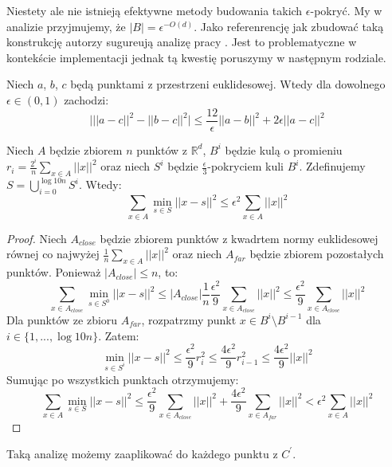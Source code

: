 \noindent
Niestety ale nie istnieją efektywne metody budowania takich $\epsilon$-pokryć.
My w analizie przyjmujemy, że  $|B| = \epsilon^{-O(d)}$.
Jako referenrencję jak zbudować taką konstrukcję autorzy sugureują analizę pracy \cite{chazelle_2000}.
Jest to problematyczne w kontekście implementacji jednak tą kwestię poruszymy w następnym rodziale.
\begin{lemma}{\cite{DBLP:journals/ki/MunteanuS18}}
    Niech $a$, $b$, $c$ będą punktami z przestrzeni euklidesowej.
    Wtedy dla dowolnego $\epsilon \in (0,1)$ zachodzi:
    \begin{equation}
        \Big| ||a-c||^{2} - ||b-c||^{2} \Big| \leq \frac{12}{\epsilon} ||a-b||^2 + 2\epsilon||a-c||^2
    \end{equation}
\end{lemma}
\begin{lemma}
    Niech $A$ będzie zbiorem $n$ punktów z $\mathbb{R}^d$, $B^{i}$ będzie kulą o promieniu $r_{i} = \frac{2^{i}}{n}\sum_{x \in A} ||x||^{2}$ oraz niech $S^{i}$ będzie $\frac{\epsilon}{3}$-pokryciem kuli $B^{i}$.
    Zdefinujemy $S = \bigcup_{i=0}^{\log 10n} S^{i}$. 
    Wtedy:
    \begin{equation}
        \sum_{x\in A} \min_{s \in S} ||x - s||^{2} \leq \epsilon^{2} \sum_{x \in A} ||x||^{2}
    \end{equation}
\end{lemma}
\begin{proof}
    Niech $A_{close}$ będzie zbiorem punktów z kwadrtem normy euklidesowej równej co najwyżej $\frac{1}{n}\sum_{x \in A}||x||^{2}$ oraz niech $A_{far}$ będzie zbiorem pozostałych punktów.
    Ponieważ $|A_{close}| \leq n$, to:
    \begin{equation}
        \sum_{x\in A_{close}} \min_{s \in S^{0}} ||x - s||^{2} \leq |A_{close}|\frac{1}{n}\frac{\epsilon^{2}}{9}\sum_{x \in A_{close}}||x||^{2} \leq \frac{\epsilon^{2}}{9}\sum_{x \in A_{close}}||x||^{2}
    \end{equation}
    \noindent
    Dla punktów ze zbioru $A_{far}$, rozpatrzmy punkt $x \in B^{i} \setminus B^{i-1}$ dla $i \in \{1, ..., \log10n \}$.
    Zatem:
    \begin{equation}
       \min_{s \in S^{i}} ||x - s||^{2} \leq \frac{\epsilon^{2}}{9} r_{i}^{2} \leq \frac{4\epsilon^{2}}{9} r_{i-1}^{2} \leq \frac{4\epsilon^{2}}{9} ||x||^2
    \end{equation}
    Sumując po wszystkich punktach otrzymujemy:
    \begin{equation}
        \sum_{x\in A} \min_{s \in S} ||x - s||^{2} \leq \frac{\epsilon^{2}}{9}\sum_{x \in A_{close}}||x||^{2} + \frac{4\epsilon^{2}}{9} \sum_{x \in A_{far}}||x||^2 < \epsilon^{2} \sum_{x \in A} ||x||^{2}
    \end{equation}
\end{proof}
\noindent
Taką analizę możemy zaaplikować do każdego punktu z $C^{'}$.

